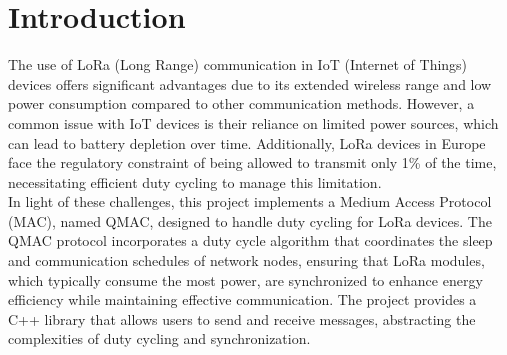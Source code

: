 \section*{Introduction}

The use of LoRa (Long Range) communication in IoT (Internet of Things) devices offers significant advantages due to its extended wireless range and low power consumption compared to other communication methods. However, a common issue with IoT devices is their reliance on limited power sources, which can lead to battery depletion over time. Additionally, LoRa devices in Europe face the regulatory constraint of being allowed to transmit only 1\% of the time, necessitating efficient duty cycling to manage this limitation. \\

In light of these challenges, this project implements a Medium Access Protocol (MAC), named QMAC, designed to handle duty cycling for LoRa devices. The QMAC protocol incorporates a duty cycle algorithm that coordinates the sleep and communication schedules of network nodes, ensuring that LoRa modules, which typically consume the most power, are synchronized to enhance energy efficiency while maintaining effective communication. The project provides a C++ library that allows users to send and receive messages, abstracting the complexities of duty cycling and synchronization.
